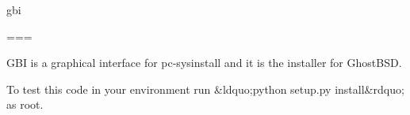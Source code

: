 

gbi

===



GBI is a graphical interface for pc-sysinstall and it is the installer for GhostBSD.



To test this code in your environment run &ldquo;python setup.py install&rdquo; as root.


